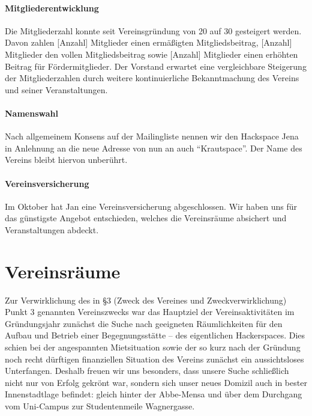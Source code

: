 \documentclass[10pt,DIV16]{scrartcl}
\begin{document}
\paragraph{Mitgliederentwicklung}

Die Mitgliederzahl konnte seit Vereinsgründung von 20 auf 30 gesteigert
werden.  Davon zahlen [Anzahl] Mitglieder einen ermäßigten Mitgliedsbeitrag,
[Anzahl] Mitglieder den vollen Mitgliedsbeitrag sowie [Anzahl] Mitglieder
einen erhöhten Beitrag für Fördermitglieder.  Der Vorstand erwartet eine
vergleichbare Steigerung der Mitgliederzahlen durch weitere kontinuierliche
Bekanntmachung des Vereins und seiner Veranstaltungen.

\paragraph{Namenswahl}

Nach allgemeinem Konsens auf der Mailingliste nennen wir den Hackspace Jena in
Anlehnung an die neue Adresse von nun an auch "`Krautspace"'.  Der Name des
Vereins bleibt hiervon unberührt.

\paragraph{Vereinsversicherung}

Im Oktober hat Jan eine Vereinsversicherung abgeschlossen.  Wir haben uns für
das günstigste Angebot entschieden, welches die Vereinsräume absichert und
Veranstaltungen abdeckt.


\section{Vereinsräume}

Zur Verwirklichung des in §3 (Zweck des Vereines und Zweckverwirklichung)
Punkt 3 genannten Vereinszwecks war das Hauptziel der Vereinsaktivitäten im
Gründungsjahr zunächst die Suche nach geeigneten Räumlichkeiten für den Aufbau
und Betrieb einer Begegnungsstätte -- des eigentlichen Hackerspaces.  Dies
schien bei der angespannten Mietsituation sowie der so kurz nach der Gründung
noch recht dürftigen finanziellen Situation des Vereins zunächst ein
aussichtsloses Unterfangen.  Deshalb freuen wir uns besonders, dass unsere
Suche schließlich nicht nur von Erfolg gekrönt war, sondern sich unser neues
Domizil auch in bester Innenstadtlage befindet:  gleich hinter der Abbe-Mensa
und über dem Durchgang vom Uni-Campus zur Studentenmeile Wagnergasse.
\end{document}
